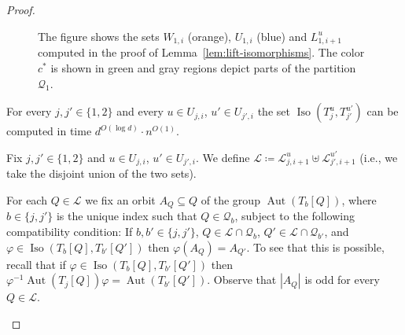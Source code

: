 \documentclass{theoretics}
\newcommand{\CL}{{\mathcal L}}
\newcommand{\CQ}{{\mathcal Q}}
\DeclareMathOperator{\Aut}{Aut}
\DeclareMathOperator{\Iso}{Iso}
\begin{document}
\begin{proof}
\begin{figure}
{
  }
  \caption{The figure shows the sets $W_{1,i}$ (orange), $U_{1,i}$ (blue) and $L_{1,i+1}^{u}$ computed in the proof of Lemma~\ref{lem:lift-isomorphisms}.
   The color $c^*$ is shown in green and gray regions depict parts of the partition $\CQ_1$.}
  \label{fig:extend-isomorphisms}
 \end{figure}

 \begin{claim}
  \label{cl:compute-isomorphism-set-local}
  For every $j,j' \in \{1,2\}$ and every $u \in U_{j,i}$, $u' \in U_{j',i}$ the set $\Iso(T_j^u,T_{j'}^{u'})$ can be computed in time $d^{O(\log d)} \cdot n^{O(1)}$.
 \end{claim}

 \begin{subproof}
  Fix $j,j' \in \{1,2\}$ and $u \in U_{j,i}$, $u' \in U_{j',i}$.
  We define $\CL \coloneqq \CL_{j,i+1}^{u} \uplus \CL_{j',i+1}^{u'}$ (i.e., we take the disjoint union of the two sets).


  For each $Q \in \CL$ we fix an orbit $A_Q \subseteq Q$ of the group $\Aut(T_b[Q])$, where $b \in \{j,j'\}$ is the unique index such that $Q \in \CQ_b$, subject to the following compatibility condition:
  If $b,b' \in \{j,j'\}$, $Q \in \CL \cap \CQ_b$, $Q' \in \CL \cap \CQ_{b'}$, and $\varphi \in \Iso(T_b[Q],T_{b'}[Q'])$ then $\varphi(A_Q) = A_{Q'}$.
  To see that this is possible, recall that if $\varphi \in \Iso(T_b[Q],T_{b'}[Q'])$ then $\varphi^{-1}\Aut(T_j[Q])\varphi = \Aut(T_{b'}[Q'])$.
  Observe that $|A_Q|$ is odd for every $Q \in \CL$.


\end{subproof}
\end{proof}
\end{document}

